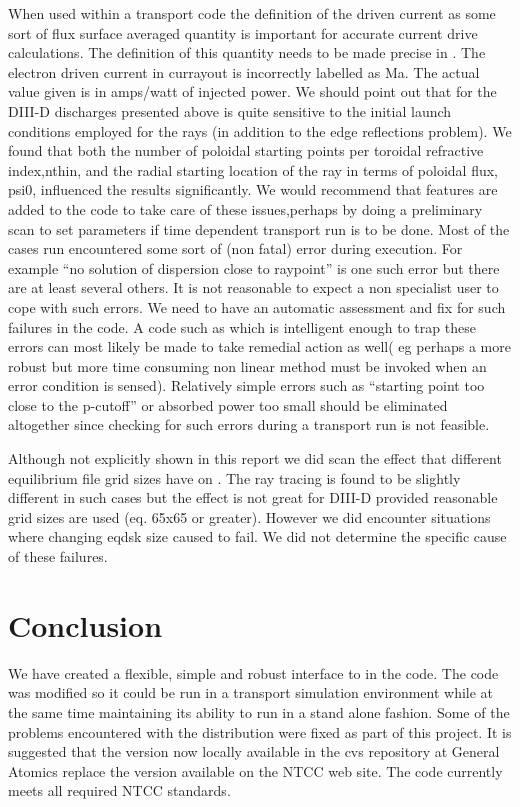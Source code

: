  When used within a transport code the definition of the driven
  current as some sort of flux surface averaged quantity is
  important  for accurate current drive calculations. The definition
  of this quantity needs to be made precise in \ct. The electron
  driven current in currayout is incorrectly labelled as Ma. The
  actual value given  is in amps/watt of injected power. 
   We should point out that for the DIII-D discharges
   presented above  \ct is
   quite sensitive to the initial launch conditions employed for the
   rays (in addition to the edge reflections problem).
   We found that both the number of poloidal starting points per
   toroidal refractive index,nthin, and the radial starting location
   of the ray in terms of poloidal flux, psi0, influenced the results
   significantly. We would recommend that features are added to the
   code to take care of these issues,perhaps by doing a preliminary
   scan to set parameters if time dependent transport run is to be done.
 Most of the cases run encountered some sort of (non fatal)  error
 during execution. For example ``no solution of dispersion close to
   raypoint'' is one such error but there are at least several others.
 It is not reasonable to expect a non  specialist user to cope with such
 errors. We need to have an automatic
   assessment and fix for such failures in the code. A code such as \ct
   which is
   intelligent enough to trap these errors can most likely be made to
   take remedial action as well( eg perhaps a  more robust
but more time consuming  non linear method
   must be invoked when an error condition is sensed).
  Relatively simple errors such as  ``starting point too close to the
 p-cutoff'' or absorbed power too small  should be eliminated
  altogether since checking for such errors during a transport run is
  not feasible.
 
 Although not
explicitly shown in this report we did scan the effect that different
equilibrium file grid sizes have on \ct. The ray tracing is found  to
be slightly different in such cases but the effect is not great for
DIII-D provided reasonable grid sizes are used (eq. 65x65 or greater).
However we did encounter situations where changing eqdsk size caused 
\ct to fail. We did not determine the specific cause of these failures. 


\section {Conclusion}\label{conc}
 We have created a flexible, simple and robust interface to \ct in the
 \ot code. The \ct code was modified so it could be run in a transport
 simulation environment while at the same time maintaining  its ability to
 run in a stand alone fashion. Some of the problems encountered with
 the distribution were fixed as part of this project. It is suggested
 that the \ct version now locally available in the cvs repository
 at General Atomics replace the version available on the NTCC web
 site.  The code currently meets  all required NTCC standards.

